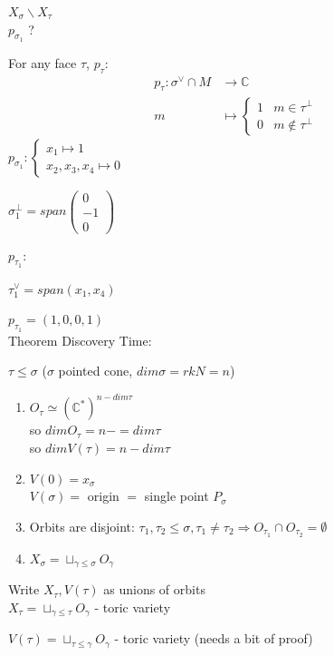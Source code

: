 \documentclass[a4paper,12pt]{amsart}
\newcommand{\C}{\ensuremath{\mathbb{C}}}
\begin{document}
$X_\sigma\backslash X_\tau$
\\

$ p_{\sigma_1} $ ?

For any face $ \tau $, $p_\tau:$
\begin{align*}
	p_\tau : \sigma^\vee \cap M &\to \C\\
	m &\mapsto \begin{cases}
	1 & m\in \tau^\perp \\
	0 & m\not\in \tau^\perp
	\end{cases}
\end{align*}
$p_{\sigma_1}: \begin{cases}
x_1\mapsto 1 \\ x_2,x_3,x_4 \mapsto 0
\end{cases}$

$\sigma_1^\perp = span \left( \begin{array}{c}  0 \\ -1 \\ 0 \end{array}  \right)$

$ p_{\tau_1}:$

$\tau_1^\vee=span(x_1,x_4)$

$p_{\tau_1}=(1,0,0,1) $
\\

Theorem Discovery Time:

$\tau\leq \sigma$ ($\sigma$ pointed cone, $dim
\sigma= rkN=n$)
\begin{enumerate}[1)]
\item $O_\tau \simeq (\C^*)^{n-dim\tau}$\\
so  $ dim O_\tau= n-=dim\tau $\\
so $dimV(\tau) =n-dim\tau$
\item $ V(0)=x_\sigma $\\
$ V(\sigma) =  $ origin $=$ single point $P_\sigma$
\item Orbits are disjoint: $ \tau_1, \tau_2 \leq \sigma, \tau_1\neq \tau_2 \Rightarrow O_{\tau_1} \cap O_{\tau_2} = \emptyset $
\item $ X_\sigma = \sqcup _{\gamma\leq \sigma} O_\gamma $
\end{enumerate}
Write $ X_\tau, V(\tau) $ as unions of orbits
\\

$X_\tau=\sqcup_{\gamma\leq \tau} O_\gamma$ - toric variety

$ V(\tau) = \sqcup_{\tau\leq \gamma} O_\gamma $ - toric variety (needs a bit of proof)
\end{document}
